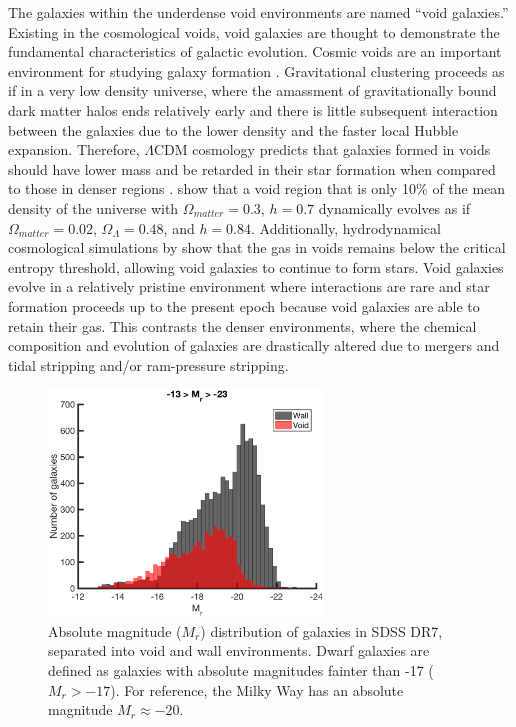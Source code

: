 The galaxies within the underdense void environments are named ``void 
galaxies.''  Existing in the cosmological voids, void galaxies are thought to 
demonstrate the fundamental characteristics of galactic evolution.  Cosmic voids 
are an important environment for studying galaxy formation \citep[see][for a 
review]{vandeWeygaert11}.  Gravitational clustering proceeds as if in a very low 
density universe, where the amassment of gravitationally bound dark matter halos 
ends relatively early and there is little subsequent interaction between the 
galaxies due to the lower density and the faster local Hubble expansion.  
Therefore, $\Lambda$CDM cosmology predicts that galaxies formed in voids should 
have lower mass and be retarded in their star formation when compared to those 
in denser regions \cite[e.g.,][]{Gottlober03,Goldberg05,Cen11}.  
\cite{Goldberg04} show that a void region that is only 10\% of the mean density 
of the universe with $\Omega_{matter} = 0.3$, $h = 0.7$ dynamically evolves as 
if $\Omega_{matter} = 0.02$, $\Omega_\Lambda = 0.48$, and $h = 0.84$.  
Additionally, hydrodynamical cosmological simulations by \cite{Cen11} show that 
the gas in voids remains below the critical entropy threshold, allowing void 
galaxies to continue to form stars.  Void galaxies evolve in a relatively 
pristine environment where interactions are rare and star formation proceeds up 
to the present epoch because void galaxies are able to retain their gas.  This 
contrasts the denser environments, where the chemical composition and evolution 
of galaxies are drastically altered due to mergers and tidal stripping and/or 
ram-pressure stripping.





\begin{figure}
    \includegraphics[width=0.65\textwidth]{Images/Intro/1sig_13-23_SDSS_Mr_hist_count_fill}
    \caption[Absolute magnitude distribution of galaxies in SDSS DR7]{Absolute 
    magnitude ($M_r$) distribution of galaxies in SDSS DR7, separated into void 
    and wall environments.  Dwarf galaxies are defined as galaxies with absolute 
    magnitudes fainter than -17 ($M_r > -17$).  For reference, the Milky Way has 
    an absolute magnitude $M_r \approx -20$.}
\end{figure}



